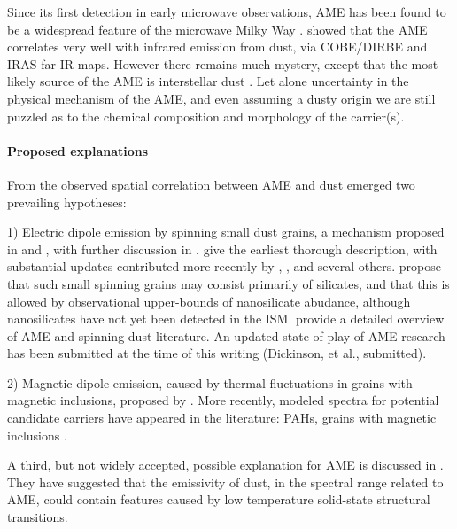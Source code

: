      Since its first detection in early microwave observations, AME has been found to be a widespread feature of the microwave Milky Way \citep{dickinson13r}. \cite{kogut96,deoliveiracosta97,leitch98} showed that the AME correlates very well with infrared emission from dust, via COBE/DIRBE and IRAS far-IR maps. However there remains much mystery, except that the most likely source of the AME is interstellar dust \citep{ysard10a,tibbs11,hensley16}. Let alone uncertainty in the physical mechanism of the AME, and even assuming a dusty origin\- we are still puzzled as to the chemical composition and morphology of the carrier(s).



  \paragraph{Proposed explanations}

     From the observed spatial correlation between AME and dust emerged two prevailing hypotheses:

    1) Electric dipole emission by spinning small dust grains, a mechanism proposed in \cite{erickson57} and \cite{hoyle70}, with further discussion in \cite{ferrara94}. \cite{draine98b} give the earliest thorough description, with substantial updates contributed more recently by \cite{ysard10a}, \cite{ali-haimoud09}, \cite{hoang10} and several others. \cite{hensley17a} propose that such small spinning grains may consist primarily of silicates, and that this is allowed by observational upper-bounds of nanosilicate abudance, although nanosilicates have not yet been detected in the ISM. \cite{dickinson13r} provide a detailed overview of AME and spinning dust literature. An updated state of play of AME research has been submitted at the time of this writing (Dickinson, et al., submitted).

    2) Magnetic dipole emission, caused by thermal fluctuations in grains with magnetic inclusions, proposed by \cite{draine99}.
     More recently, modeled spectra for potential candidate carriers have appeared in the literature: PAHs, grains with magnetic inclusions \citep{draine13, ali-haimoud14, hoang16a}.

    A third, but not widely accepted, possible explanation for AME is discussed in \cite{jones09}. They have suggested that the emissivity of dust, in the spectral range related to AME, could contain features caused by low temperature solid-state structural transitions.

